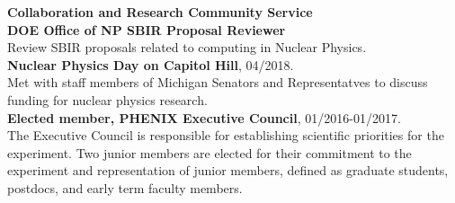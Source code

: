 \documentclass[11pt]{article}
\begin{document}




\begin{flushleft}
\Large\textbf{Collaboration and Research Community Service} \\
\normalsize 
\vspace{0.3cm}
\textbf{DOE Office of NP SBIR Proposal Reviewer} \\ Review SBIR proposals related to computing in Nuclear Physics. \\
\vspace*{0.2cm}
\textbf{Nuclear Physics Day on Capitol Hill}, 04/2018. \\ Met with staff members of Michigan Senators and Representatves to discuss funding for nuclear physics research.\\
\vspace*{0.2cm}
\textbf{Elected member, PHENIX Executive Council}, 01/2016-01/2017.\\ The Executive Council is responsible for establishing scientific priorities for the experiment. Two junior members are elected for their commitment to the experiment and representation of junior members, defined as graduate students, postdocs, and early term faculty members.



\end{flushleft}




%
%
%

\newpage




\cleardoublepage
\end{document}
